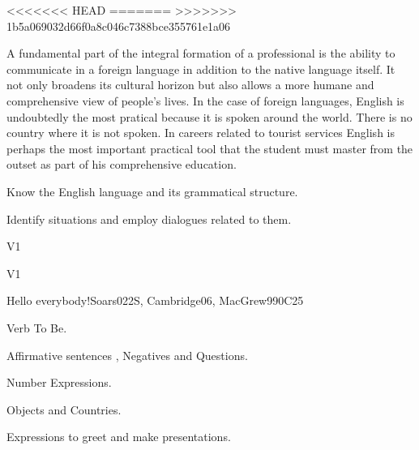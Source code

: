 \begin{syllabus}

<<<<<<< HEAD
=======
>>>>>>> 1b5a069032d66f0a8c046c7388bce355761e1a06

\begin{justification}
A fundamental part of the integral formation of a professional is the ability to communicate in a foreign language in addition to the native language itself. 
It not only broadens its cultural horizon but also allows a more humane and comprehensive view of people's lives. In the case of foreign languages, English is undoubtedly the most pratical because it is spoken around the world. There is no country where it is not spoken. In careers related to tourist services English is perhaps the most important practical tool that the student must master from the outset as part of his comprehensive education.
\end{justification}

\begin{goals}
\item Know the English language and its grammatical structure.
\item Identify situations and employ dialogues related to them.
\end{goals}

\begin{outcomes}{V1}
\item {}
\end{outcomes}

\begin{competences}{V1}
\item {}
\end{competences}

\begin{unit}{Hello everybody!}{}{Soars022S, Cambridge06, MacGrew99}{0}{C25}
   \begin{topics}
      \item Verb To Be.
      \item Affirmative sentences , Negatives and Questions.
      \item Number Expressions.
      \item Objects and Countries.
      \item Expressions to greet and make presentations.
   \end{topics}


\end{unit}
\end{syllabus}
